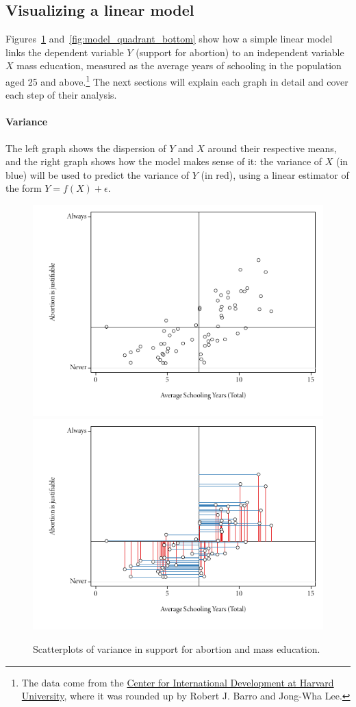   \subsection{Visualizing a linear model}%

Figures~\ref{fig:model_quadrant_top} and~\ref{fig:model_quadrant_bottom} show how a simple linear model links the dependent variable $Y$ (support for abortion) to an independent variable $X$ mass education, measured as the average years of schooling in the population aged 25 and above.\footnote{The data come from the \href{http://www.hks.harvard.edu/centers/cid}{Center for International Development at Harvard University}, where it was rounded up by Robert J. Barro and Jong-Wha Lee.} The next sections will explain each graph in detail and cover each step of their analysis.

\paragraph{Variance} The left graph shows the dispersion of $Y$ and $X$ around their respective means, and the right graph shows how the model makes sense of it: the variance of $X$ (in blue) will be used to predict the variance of $Y$ (in red), using a linear estimator of the form $Y = f(X) + \epsilon$.

\begin{figure}[htp]
	\centering
	\includegraphics[width=.6\textwidth]{images/abortion_sc_means.pdf}\\
	\includegraphics[width=.6\textwidth]{images/abortion_sc_variance.pdf}

	\caption[Support for abortion and mass education (1): Variance]{\label{fig:model_quadrant_top}%
	Scatterplots of variance in support for abortion and mass education. %
	\qog}
\end{figure}%

